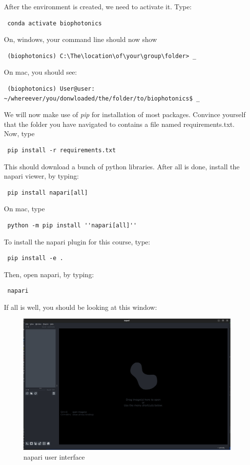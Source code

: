 \documentclass[11pt]{article} %
\begin{document}
After the environment is created, we need to activate it. Type:
\begin{verbatim} conda activate biophotonics \end{verbatim}
On, windows, your command line should now show 
\begin{verbatim} (biophotonics) C:\The\location\of\your\group\folder> _ \end{verbatim}
 
On mac, you should see:
\begin{verbatim} (biophotonics) User@user: ~/whereever/you/donwloaded/the/folder/to/biophotonics$ _ \end{verbatim}

We will now make use of {\it pip} for installation of most packages. Convince yourself that the folder you have navigated to contains a file named requirements.txt. Now, type
\begin{verbatim} pip install -r requirements.txt \end{verbatim}
This should download a bunch of python libraries. After all is done, install the napari viewer, by typing:

\begin{verbatim} pip install napari[all] \end{verbatim}
 
 On mac, type
\begin{verbatim} python -m pip install ''napari[all]'' \end{verbatim}
  
To install the napari plugin for this course, type:
 
\begin{verbatim} pip install -e . \end{verbatim}
 
Then, open napari, by typing:
 
\begin{verbatim} napari \end{verbatim}
 
 If all is well, you should be looking at this window:
 
 \begin{figure}[H]
 \includegraphics[width=14cm]{images/napari_viewer_1.png}
 \caption{napari user interface}
 \end{figure}
 
\end{document}
